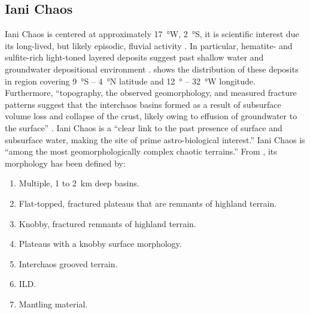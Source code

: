 \subsection{Iani Chaos}
\label{sec:MissionSites:IaniChaos}
Iani Chaos is centered at approximately \SI{17}{\degree}W, \SI{2}{\degree}S, it is scientific interest due its long-lived, but likely episodic, fluvial activity . In particular, hematite- and sulfite-rich light-toned layered deposits suggest past shallow water and groundwater depositional environment .  shows the distribution of these deposits in region covering \SI{9}{\degree}S – \SI{4}{\degree}N latitude and \SI{12}{\degree} – \SI{32}{\degree}W longitude. Furthermore, ``topography, the observed geomorphology, and measured fracture patterns suggest that the interchaos basins formed as a result of subsurface volume loss and collapse of the crust, likely owing to effusion of groundwater to the surface'' . Iani Chaos is a ``clear link to the past presence of surface and subsurface water, making the site of prime astro-biological interest.''  Iani Chaos is ``among the most geomorphologically complex chaotic terrains.'' From  , its morphology has been defined by:

\begin{enumerate}[label=\textcolor{BulletBlue}{(\alph*)}]
    \item Multiple, 1 to \SI{2}{\kilo\meter} deep basins.
    \item Flat‐topped, fractured plateaus that are remnants of highland terrain.
    \item Knobby, fractured remnants of highland terrain.
    \item Plateaus with a knobby surface morphology.
    \item Interchaos grooved terrain.
    \item \ac{ILD}.
    \item Mantling material.
\end{enumerate}

